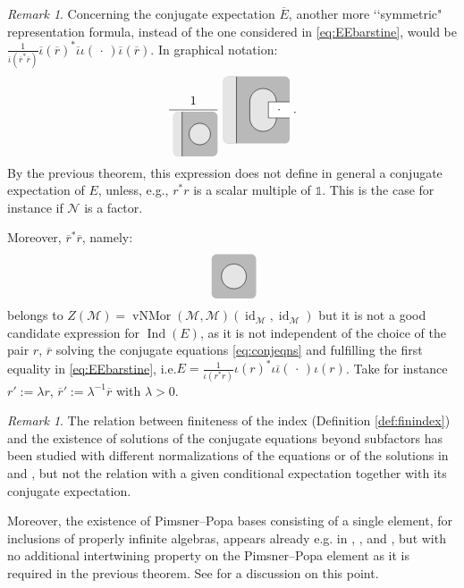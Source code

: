 \documentclass[11pt,a4paper]{article}
\makeatletter
\newcommand{\oneop}{\mathds{1}}
\newcommand{\rbar}{{\overline{r}}}
\newcommand{\iotabar}{{\overline{\iota}}}
\newcommand{\Ebar}{{\overline{E}}}
\newcommand{\slot}{{\,\cdot \,}}
\newcommand{\M}{\mathcal{M}}
\newcommand{\N}{\mathcal{N}}
\DeclareMathOperator{\vNMor}{vNMor}
\DeclareMathOperator{\Ind}{Ind}
\DeclareMathOperator{\id}{id}
\newcommand{\lqq}{\lq\lq}
\DeclareRobustCommand{\eg}{e.g.\@\xspace}
\DeclareRobustCommand{\ie}{i.e.\@\xspace}
\DeclareRobustCommand{\Sec}{Sec.\@\xspace}
\DeclareRobustCommand{\Prop}{Prop.\@\xspace}
\DeclareRobustCommand{\Cor}{Cor.\@\xspace}
\DeclareRobustCommand{\Thm}{Thm.\@\xspace}
\DeclareRobustCommand{\Rmk}{Rmk.\@\xspace}
\theoremstyle{plain}
\theoremstyle{definition}
\theoremstyle{remark}
\newtheorem{rmk}[thm]{Remark}
\numberwithin{equation}{section}%
\newcommand{\colN}{gray!20}
\newcommand{\colM}{gray!55}
\newcommand{\tikzmath}[2][]
     {\vcenter{\hbox{
     \begin{tikzpicture}[#1]#2
     \end{tikzpicture}}}
     }
\makeatother
\begin{document}
\begin{rmk}\label{rmk:wrongEbar}
Concerning the conjugate expectation $\Ebar$, another more \lqq symmetric" representation formula, instead of the one considered in \eqref{eq:EEbarstine}, would be $\frac{1}{\iotabar(\rbar^*\rbar)} \iotabar(\rbar)^* \iotabar\iota (\slot) \iotabar(\rbar)$. In graphical notation: 
\begin{align}
\frac{1}{\tikzmath[scale=.5]{
\fill[\colM,rounded corners] (-1,-1.25) rectangle (1.5,1.25);
\clip[rounded corners] (-1,-1.25) rectangle (1.5,1.25);
\fill[\colN] (-1,-1.25) rectangle (-.5,1.25);
\draw (-.5,-1.25) -- (-.5,1.25);
\draw[fill = \colN] (.5,0) circle (.6);
}}
\tikzmath[scale=.75]{
\fill[\colM,rounded corners] (-1,-1.25) rectangle (1.5,1.25);
\clip[rounded corners] (-1,-1.25) rectangle (1.5,1.25);
\fill[\colN] (-1,-1.25) rectangle (-.5,1.25);
\draw (-.5,-1.25) -- (-.5,1.25);
\draw[fill = \colN] (1,-.25) -- (1,-.3) arc (360:180:.5) -- (0,.3) arc (180:0:.5) -- (1,.25);
\fill[white] (1.5,-.3) -- (.7,-.3) -- (.7,.3) -- (1.5,.3);
\draw (1.5,-.3) -- (.7,-.3)--(.7,.3) -- (1.5,.3);
\draw (1.1,0) node {$\slot$};
}\;.
\end{align}
By the previous theorem, this expression does not define in general a conjugate expectation of $E$, unless, \eg, 
$r^*r$ is a scalar multiple of $\oneop$.
This is the case for instance if $\N$ is a factor.

Moreover, $\rbar^* \rbar$, namely:
\begin{align}
\tikzmath[scale=.5]{
\fill[\colM,rounded corners] (-1,-1.25) rectangle (1.5,1.25);
\draw[fill = \colN] (.25,0) circle (.7);
}
\end{align}
belongs to $Z(\M) = \vNMor(\M,\M)(\id_\M,\id_\M)$ but it is not a good candidate expression for $\Ind(E)$, as it is not independent of the choice of the pair $r$, $\rbar$ solving the conjugate equations \eqref{eq:conjeqns} and fulfilling the first equality in \eqref{eq:EEbarstine}, \ie $E = \frac{1}{\iota(r^*r)} \iota(r)^* \iota\iotabar (\slot) \iota(r)$. Take for instance $r' := \lambda r$, $\rbar' := \lambda^{-1} \rbar$ with $\lambda > 0$.
\end{rmk}

\begin{rmk}
The relation between finiteness of the index (Definition \ref{def:finindex}) and the existence of solutions of the conjugate equations beyond subfactors has been studied with different normalizations of the equations or of the solutions in \cite[\Sec 5]{FiIs95} and \cite[\Sec 7]{BDH14}, but not the relation with a given conditional expectation together with its conjugate expectation.

Moreover, the existence of Pimsner--Popa bases consisting of a single element, for inclusions of properly infinite algebras, appears already \eg in \cite[\Sec 3]{Kos86}, \cite[\Prop 3.22]{BDH88}, \cite[\Cor 5.6]{Lon90} and \cite[\Thm 1.1.6, \Rmk 1.1.7]{PopBook}, but with no additional intertwining property on the Pimsner--Popa element as it is required in the previous theorem. See \cite[\Rmk 3.8]{DVGi18} for a discussion on this point.
\end{rmk}
\end{document}
